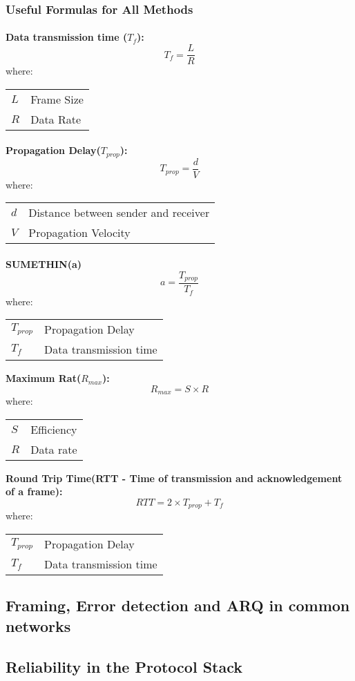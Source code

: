 \documentclass[../resumosRCOM.tex]{subfiles}
\makeatletter
\newenvironment{conditions}
  {\par\vspace{\abovedisplayskip}\noindent\begin{tabular}{>{$}l<{$} @{${}={}$} l}}
  {\end{tabular}\par\vspace{\belowdisplayskip}}
\makeatother
\begin{document}
\subsubsection{Useful Formulas for All Methods}

\paragraph{}
\textbf{Data transmission time ($T_f$):}
\begin{equation}
    {T_f}=\frac{L}{R}
\end{equation}
where:
\begin{conditions}
   L     &   Frame Size\\
   R &  Data Rate 
\end{conditions}

\paragraph{}
\textbf{Propagation Delay($T_{prop}$):}
\begin{equation}
    {T_{prop}}=\frac{d}{V}
\end{equation}
where:
\begin{conditions}
   d     &   Distance between sender and receiver \\
   V &  Propagation Velocity
\end{conditions}

\paragraph{}
\textbf{SUMETHIN(a)}
\begin{equation}
    {a}=\frac{T_{prop}}{T_f}
\end{equation}
where:
\begin{conditions}
    T_{prop}    &  Propagation Delay \\
   T_f     &  Data transmission time 
\end{conditions}

\textbf{Maximum Rat($R_{max}$):}
\begin{equation}
    {R_{max}}={S}\times{R}
\end{equation}
where:
\begin{conditions}
   S     &  Efficiency\\
   R &  Data rate
\end{conditions}

\textbf{Round Trip Time(RTT - Time of transmission and acknowledgement of a frame):} 
\begin{equation}
    {RTT}= 2 \times {T_{prop}} + {T_f}
\end{equation}
where:
\begin{conditions}
   T_{prop}     &  Propagation Delay\\
   T_f &   Data transmission time
\end{conditions}

\subsection{Framing, Error detection and ARQ in common networks}
\subsection{Reliability in the Protocol Stack}
\end{document}

